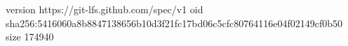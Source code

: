 version https://git-lfs.github.com/spec/v1
oid sha256:5416060a8b8847138656b10d3f21fc17bd06c5cfc80764116e04f02149cf0b50
size 174940
